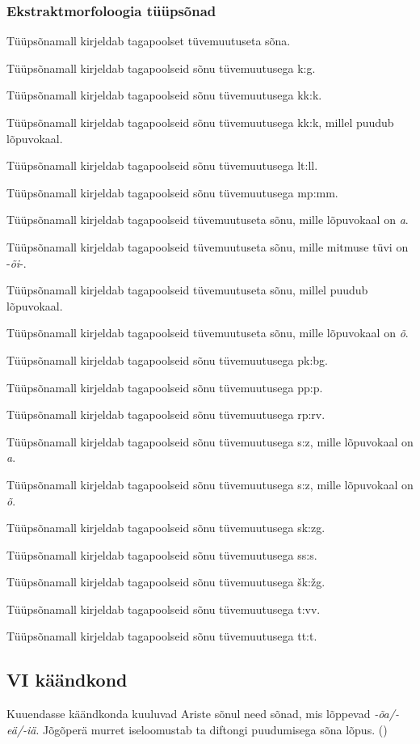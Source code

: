 \documentclass[12pt,a4paper]{article}
\newcommand{\vadja}[1]{\textit{#1}}
\begin{document}
\subsubsection*{Ekstraktmorfoloogia tüüpsõnad}
\vspace{-3.5em}

Tüüpsõna\-mall kirjeldab tagapoolset tüvemuutuseta sõna.

Tüüpsõna\-mall kirjeldab tagapoolseid sõnu tüvemuutusega k:g.

Tüüpsõna\-mall kirjeldab tagapoolseid sõnu tüvemuutusega kk:k.

Tüüpsõna\-mall kirjeldab tagapoolseid sõnu tüvemuutusega kk:k, millel puudub lõpuvokaal.

Tüüpsõna\-mall kirjeldab tagapoolseid sõnu tüvemuutusega lt:ll.

Tüüpsõna\-mall kirjeldab tagapoolseid sõnu tüvemuutusega mp:mm.

Tüüpsõna\-mall kirjeldab tagapoolseid tüvemuutuseta sõnu, mille lõpuvokaal on \textit{a}.

Tüüpsõna\-mall kirjeldab tagapoolseid tüvemuutuseta sõnu, mille mitmuse tüvi on -\textit{õi}-.

Tüüpsõna\-mall kirjeldab tagapoolseid tüvemuutuseta sõnu, millel puudub lõpuvokaal.

Tüüpsõna\-mall kirjeldab tagapoolseid tüvemuutuseta sõnu, mille lõpuvokaal on \textit{õ}.

Tüüpsõna\-mall kirjeldab tagapoolseid sõnu tüvemuutusega pk:bg.

Tüüpsõna\-mall kirjeldab tagapoolseid sõnu tüvemuutusega pp:p.

Tüüpsõna\-mall kirjeldab tagapoolseid sõnu tüvemuutusega rp:rv.

Tüüpsõna\-mall kirjeldab tagapoolseid sõnu tüvemuutusega s:z, mille lõpuvokaal on \textit{a}.

Tüüpsõna\-mall kirjeldab tagapoolseid sõnu tüvemuutusega s:z, mille lõpuvokaal on \textit{õ}.

Tüüpsõna\-mall kirjeldab tagapoolseid sõnu tüvemuutusega sk:zg.

Tüüpsõna\-mall kirjeldab tagapoolseid sõnu tüvemuutusega ss:s.

Tüüpsõna\-mall kirjeldab tagapoolseid sõnu tüvemuutusega šk:žg.

Tüüpsõna\-mall kirjeldab tagapoolseid sõnu tüvemuutusega t:vv.

Tüüpsõna\-mall kirjeldab tagapoolseid sõnu tüvemuutusega tt:t.
  
\subsection{\RN{6} käändkond}

Kuuendasse käändkonda kuuluvad Ariste sõnul need sõnad, mis lõppevad \vadja{-õa/-eä/-iä}. Jõgõperä murret iseloomustab ta diftongi puudumisega sõna lõpus. (\cite[44]{ariste_grammar_1968})
\end{document}
